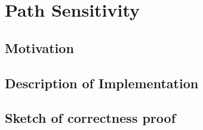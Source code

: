 \newpage
\section{Path Sensitivity}
\subsection{Motivation}
\subsection{Description of Implementation}
\subsection{Sketch of correctness proof}




